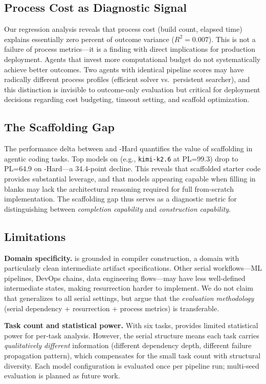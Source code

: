 \subsection{Process Cost as Diagnostic Signal}

Our regression analysis reveals that process cost (build count, elapsed time) explains essentially zero percent of outcome variance ($R^2 = 0.007$).
This is not a failure of process metrics---it is a finding with direct implications for production deployment.
Agents that invest more computational budget do not systematically achieve better outcomes.
Two agents with identical pipeline scores may have radically different process profiles (efficient solver vs.\ persistent searcher), and this distinction is invisible to outcome-only evaluation but critical for deployment decisions regarding cost budgeting, timeout setting, and scaffold optimization.

\subsection{The Scaffolding Gap}

The performance delta between \yatcc{} and \yatcc{}-Hard quantifies the value of scaffolding in agentic coding tasks.
Top models on \yatcc{} (e.g., \texttt{kimi-k2.6} at PL=99.3) drop to PL=64.9 on \yatcc{}-Hard---a 34.4-point decline.
This reveals that scaffolded starter code provides substantial leverage, and that models appearing capable when filling in blanks may lack the architectural reasoning required for full from-scratch implementation.
The scaffolding gap thus serves as a diagnostic metric for distinguishing between \emph{completion capability} and \emph{construction capability}.

\subsection{Limitations}

\textbf{Domain specificity.}
\eva{} is grounded in compiler construction, a domain with particularly clean intermediate artifact specifications.
Other serial workflows---ML pipelines, DevOps chains, data engineering flows---may have less well-defined intermediate states, making resurrection harder to implement.
We do not claim that \eva{} generalizes to all serial settings, but argue that the \emph{evaluation methodology} (serial dependency + resurrection + process metrics) is transferable.

\textbf{Task count and statistical power.}
With six tasks, \eva{} provides limited statistical power for per-task analysis.
However, the serial structure means each task carries \emph{qualitatively different} information (different dependency depth, different failure propagation pattern), which compensates for the small task count with structural diversity.
Each model configuration is evaluated once per pipeline run; multi-seed evaluation is planned as future work.

